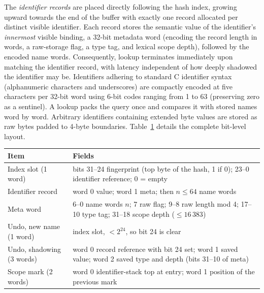 The \emph{identifier records} are placed directly following the hash index, growing upward towards the end of the buffer with exactly one record allocated per distinct visible identifier. Each record stores the semantic value of the identifier's \emph{innermost} visible binding, a 32-bit metadata word (encoding the record length in words, a raw-storage flag, a type tag, and lexical scope depth), followed by the encoded name words. Consequently, lookup terminates immediately upon matching the identifier record, with latency independent of how deeply shadowed the identifier may be. Identifiers adhering to standard C identifier syntax (alphanumeric characters and underscores) are compactly encoded at five characters per 32-bit word using 6-bit codes ranging from 1 to 63 (preserving zero as a sentinel). A lookup packs the query once and compares it with stored names word by word. Arbitrary identifiers containing extended byte values are stored as raw bytes padded to 4-byte boundaries. Table~\ref{tab:encoding} details the complete bit-level layout.

\begin{table}[t!]
\label{tab:encoding}
\centering
\setlength{\tabcolsep}{3pt}
\small
\begin{tabular}{|p{}|p{}|}
\hline
Item & Fields \\
\hline
Index slot (1 word) & bits 31--24 fingerprint (top byte of the hash, 1 if 0); 23--0 identifier reference; 0 = empty \\
Identifier record & word 0 value; word 1 meta; then $n\le64$ name words \\
Meta word & 6--0 name words $n$; 7 raw flag; 9--8 raw length mod 4; 17--10 type tag; 31--18 scope depth ($\le16\,383$) \\
Undo, new name (1 word) & index slot, $<2^{24}$, so bit 24 is clear \\
Undo, shadowing (3 words) & word 0 record reference with bit 24 set; word 1 saved value; word 2 saved type and depth (bits 31--10 of meta) \\
Scope mark (2 words) & word 0 identifier-stack top at entry; word 1 position of the previous mark \\
\hline
\end{tabular}
\end{table}

